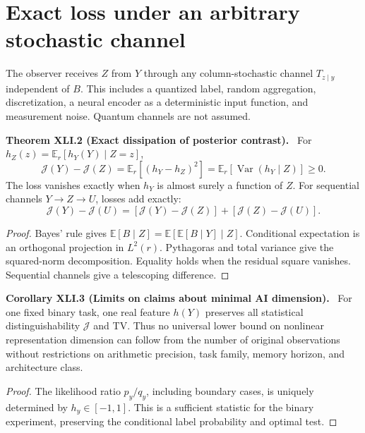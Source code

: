 \documentclass[11pt,a4paper,oneside]{book}
\newcommand{\statement}[3]{\par\medskip\noindent\textbf{#1 #2 (#3).}\ }
\begin{document}
\section{Exact loss under an arbitrary stochastic channel}
The observer receives $Z$ from $Y$ through any column-stochastic channel $T_{z\mid y}$ independent of $B$. This includes a quantized label, random aggregation, discretization, a neural encoder as a deterministic input function, and measurement noise. Quantum channels are not assumed.
\statement{Theorem}{XLI.2}{Exact dissipation of posterior contrast}
For $h_Z(z)=\mathbb E_r[h_Y(Y)\mid Z=z]$,
\begin{equation}\mathcal J(Y)-\mathcal J(Z)=\mathbb E_r[(h_Y-h_Z)^2]=\mathbb E_r[\operatorname{Var}(h_Y\mid Z)]\ge0.\tag{169}\end{equation}
The loss vanishes exactly when $h_Y$ is almost surely a function of $Z$. For sequential channels $Y\to Z\to U$, losses add exactly:
\[\mathcal J(Y)-\mathcal J(U)=[\mathcal J(Y)-\mathcal J(Z)]+[\mathcal J(Z)-\mathcal J(U)].\]
\begin{proof}
Bayes' rule gives $\mathbb E[B\mid Z]=\mathbb E[\mathbb E[B\mid Y]\mid Z]$. Conditional expectation is an orthogonal projection in $L^2(r)$. Pythagoras and total variance give the squared-norm decomposition. Equality holds when the residual square vanishes. Sequential channels give a telescoping difference.
\end{proof}
\statement{Corollary}{XLI.3}{Limits on claims about minimal AI dimension}
For one fixed binary task, one real feature $h(Y)$ preserves all statistical distinguishability $\mathcal J$ and TV. Thus no universal lower bound on nonlinear representation dimension can follow from the number of original observations without restrictions on arithmetic precision, task family, memory horizon, and architecture class.
\begin{proof}
The likelihood ratio $p_y/q_y$, including boundary cases, is uniquely determined by $h_y\in[-1,1]$. This is a sufficient statistic for the binary experiment, preserving the conditional label probability and optimal test.
\end{proof}
\end{document}
